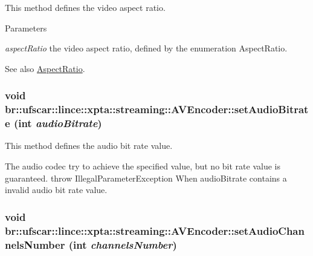 This method defines the video aspect ratio. 


\begin{DoxyParams}{Parameters}
\item[{\em aspectRatio}]the video aspect ratio, defined by the enumeration AspectRatio. \end{DoxyParams}
\begin{DoxySeeAlso}{See also}
\hyperlink{namespacebr_1_1ufscar_1_1lince_1_1xpta_1_1streaming_a252e3034c41c058052743c39f2e66103}{AspectRatio}. 
\end{DoxySeeAlso}
\hypertarget{classbr_1_1ufscar_1_1lince_1_1xpta_1_1streaming_1_1AVEncoder_a5a837df4be352cddcddba18db8f9823a}{
\subsubsection[{setAudioBitrate}]{\setlength{\rightskip}{0pt plus 5cm}void br::ufscar::lince::xpta::streaming::AVEncoder::setAudioBitrate (int {\em audioBitrate})}}
\label{classbr_1_1ufscar_1_1lince_1_1xpta_1_1streaming_1_1AVEncoder_a5a837df4be352cddcddba18db8f9823a}


This method defines the audio bit rate value. 

The audio codec try to achieve the specified value, but no bit rate value is guaranteed. throw IllegalParameterException When audioBitrate contains a invalid audio bit rate value. \hypertarget{classbr_1_1ufscar_1_1lince_1_1xpta_1_1streaming_1_1AVEncoder_ad4381d21f0ca4e1e6fc1d0dfb2c4da52}{
\subsubsection[{setAudioChannelsNumber}]{\setlength{\rightskip}{0pt plus 5cm}void br::ufscar::lince::xpta::streaming::AVEncoder::setAudioChannelsNumber (int {\em channelsNumber})}}
\label{classbr_1_1ufscar_1_1lince_1_1xpta_1_1streaming_1_1AVEncoder_ad4381d21f0ca4e1e6fc1d0dfb2c4da52}


